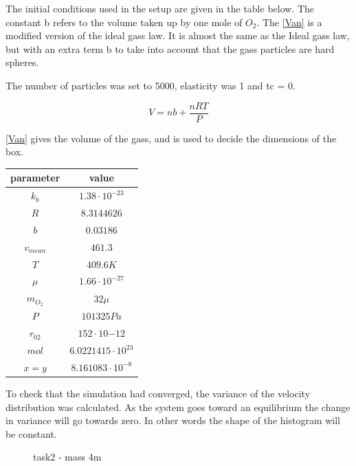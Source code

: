 The initial conditions used in the setup are 
given in the table below. The constant b refers to 
the volume taken up by one mole of $O_2$. The \autoref{Van} is a 
modified version of the ideal gass law. It is almost the same as 
the Ideal gass law, but with an extra term b to take into account 
that the gass particles are hard spheres.

The number of particles was set to 5000, elasticity was 1 and tc = 0. 

\begin{equation}
    V = n b + \frac{n R T }{P}
\label{Van}
\end{equation}

\autoref{Van} gives the volume of the gass, and is used 
to decide the dimensions of the box.


    


\begin{table}[h!]
\centering
\begin{tabular}{||c c ||} 
 \hline
    parameter & value  \\ 
  \hline\hline 
  $ k_b $& $1.38 \cdot 10^{-23}$ \\
  $R$ &$ 8.3144626$\\ 
  $b$ & $0.03186$  \cite{b}\\
  $v_{mean}$ & $461.3$ \\
  $T$ & $409.6 K$ \\
  $\mu$ & $1.66 \cdot 10^{-27}$\\
  $m_{O_{2}}$ & $32 \mu$ \\
  $P $& $101325 Pa$ \\
  $r_02$ & $152 \cdot 10{-12}$\\
  $mol$ &  $6.0221415 \cdot 10^{23}$\\
  $x = y$ &$ 8.161083 \cdot 10^{-8} $\\
 \hline
\end{tabular}
\end{table}


To check that the simulation had converged, the variance 
of the velocity distribution was calculated. As the system 
goes toward an equilibrium the change in variance will go 
towards zero. In other words the shape of the histogram
 will be constant.  


 \begin{figure}[ht]
    \centering
    \caption{task2 - mass 4m }
\end{figure}

